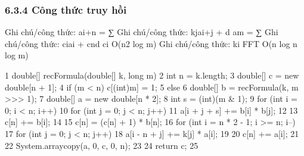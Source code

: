 \documentclass[11pt]{article}
\begin{document}
\subsubsection{6.3.4 Công thức truy hồi}
\begin{NoteBlock}
Ghi chú/công thức: ai+n =
∑
Ghi chú/công thức: kjai+j + d  am =
∑
Ghi chú/công thức: ciai + cnd   {ci}
O(n2
log m)
Ghi chú/công thức: {ki}   FFT   O(n log n log m)
\end{NoteBlock}
\begin{Code}
1 double[] recFormula(double[] k, long m) {
2 int n = k.length;
3 double[] c = new double[n + 1];
4 if (m < n) c[(int)m] = 1;
5 else {
6 double[] b = recFormula(k, m >>> 1);
7 double[] a = new double[n * 2];
8 int s = (int)(m & 1);
9 for (int i = 0; i < n; i++) {
10 for (int j = 0; j < n; j++) {
11 a[i + j + s] += b[i] * b[j];
12 }
13 c[n] += b[i];
14 }
15 c[n] = (c[n] + 1) * b[n];
16 for (int i = n * 2 - 1; i >= n; i--) {
17 for (int j = 0; j < n; j++) {
18 a[i - n + j] += k[j] * a[i];
19 }
20 c[n] += a[i];
21 }
22 System.arraycopy(a, 0, c, 0, n);
23 }
24 return c;
25 }
\end{Code}
\end{document}
